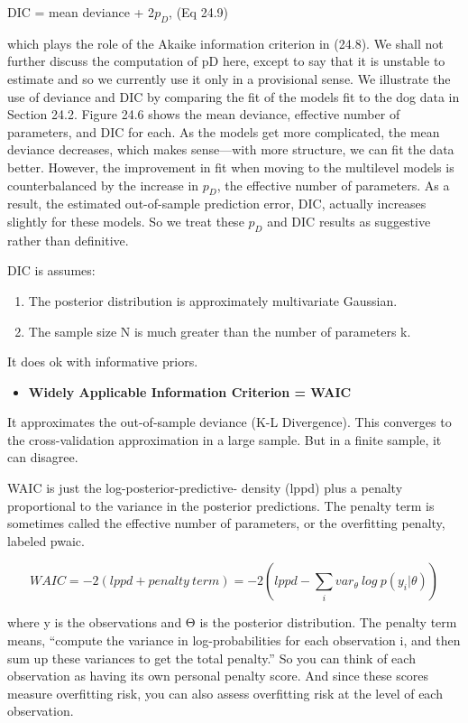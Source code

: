 \documentclass[
]{article}
\providecommand{\tightlist}{%
  \setlength{\itemsep}{0pt}\setlength{\parskip}{0pt}}
\begin{document}
DIC = mean deviance + 2\(p_D\), (Eq 24.9)

which plays the role of the Akaike information criterion in (24.8). We
shall not further discuss the computation of pD here, except to say that
it is unstable to estimate and so we currently use it only in a
provisional sense. We illustrate the use of deviance and DIC by
comparing the fit of the models fit to the dog data in Section 24.2.
Figure 24.6 shows the mean deviance, effective number of parameters, and
DIC for each. As the models get more complicated, the mean deviance
decreases, which makes sense---with more structure, we can fit the data
better. However, the improvement in fit when moving to the multilevel
models is counterbalanced by the increase in \(p_D\), the effective
number of parameters. As a result, the estimated out-of-sample
prediction error, DIC, actually increases slightly for these models. So
we treat these \(p_D\) and DIC results as suggestive rather than
definitive.

DIC is assumes:

\begin{enumerate}
\def\labelenumi{(\arabic{enumi})}
\tightlist
\item
  The posterior distribution is approximately multivariate Gaussian.
\item
  The sample size N is much greater than the number of parameters k.
\end{enumerate}

It does ok with informative priors.

\begin{itemize}
\tightlist
\item
  \textbf{Widely Applicable Information Criterion = WAIC}
\end{itemize}

It approximates the out-of-sample deviance (K-L Divergence). This
converges to the cross-validation approximation in a large sample. But
in a finite sample, it can disagree.

WAIC is just the log-posterior-predictive- density (lppd) plus a penalty
proportional to the variance in the posterior predictions. The penalty
term is sometimes called the effective number of parameters, or the
overfitting penalty, labeled pwaic.

\[WAIC= -2(lppd + penalty\:term) = -2(lppd - \sum_i var_{\theta}\:log\:p(y_i|\theta))\]

where y is the observations and Θ is the posterior distribution. The
penalty term means, ``compute the variance in log-probabilities for each
observation i, and then sum up these variances to get the total
penalty.'' So you can think of each observation as having its own
personal penalty score. And since these scores measure overfitting risk,
you can also assess overfitting risk at the level of each observation.
\end{document}
